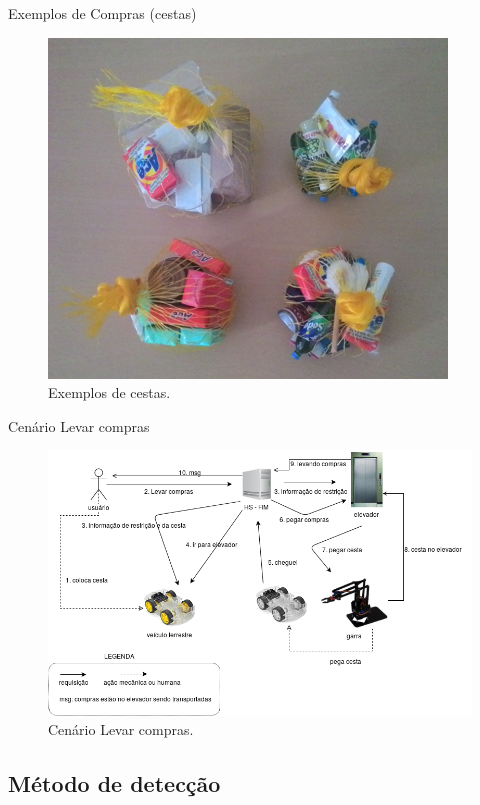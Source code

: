 \documentclass[brazil]{beamer}
\begin{document}
\begin{frame}{Exemplos de Compras (cestas)}
\begin{figure}[!htb] \centering 
  \centering
  \includegraphics[width=0.7\columnwidth]{slide/exemplos_cesta} 
  \caption{Exemplos de cestas.} 
  \label{fig:exemplos_cesta}
\end{figure}
\end{frame}

\begin{frame}{Cenário Levar compras}
\begin{figure}[!htb] \centering 
  \centering
  \includegraphics[width=0.9\columnwidth]{slide/cenario_requests} 
  \caption{Cenário Levar compras.} 
  \label{fig:cenariolevarcompras}
\end{figure}
\end{frame}


\subsection{Método de detecção}
\end{document}
